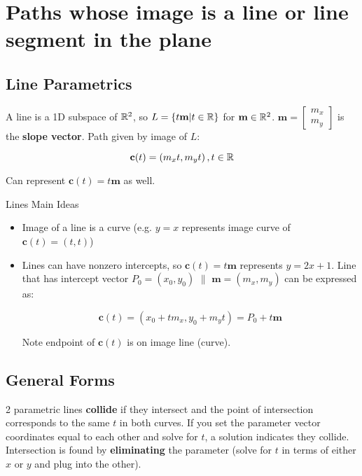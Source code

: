 \section{Paths whose image is a line or line segment in the plane}

\subsection{Line Parametrics}

A line is a 1D subspace of $\mathbb{R}^2$, so $L=\{t\textbf{m}|t\in\mathbb{R}\}$ for $\textbf{m}\in\mathbb{R}^2$.
$\textbf{m}=\begin{bmatrix}m_x\\m_y\end{bmatrix}$ is the \textbf{slope vector}.
Path given by image of $L$: 

\[\textbf{c}(t)=\left(m_{x} t, m_{y} t\right),t\in\mathbb{R}\]

Can represent $\textbf{c}(t)=t\textbf{m}$ as well.\newline

\noindent
Lines Main Ideas
\begin{itemize}
    \item Image of a line is a curve (e.g. $y=x$ represents image curve of $\textbf{c}(t)=(t,t)$)
    \item Lines can have nonzero intercepts, so $\textbf{c}(t)=t\textbf{m}$ represents $y=2x+1$. Line
    that has intercept vector $P_0=(x_0,y_0)$ $\parallel$ $\textbf{m}=(m_x,m_y)$ can be expressed as:

    \[\boxed{\textbf{c} (t)=(x_0+tm_x, y_0+m_yt)= \textbf{$P_0$}+t \textbf{m} }\]

    Note endpoint of $\textbf{c}(t)$ is on image line (curve).

\end{itemize}

\subsection{General Forms}

2 parametric lines \textbf{collide} if they intersect and the point of intersection corresponds
to the same $t$ in both curves. If you set the parameter vector coordinates equal to each
other and solve for $t$, a solution indicates they collide. Intersection is found by \textbf{eliminating}
the parameter (solve for $t$ in terms of either $x$ or $y$ and plug into the other).\newline


